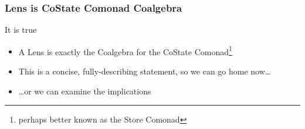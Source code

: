 \begin{frame}
\frametitle{Lens is CoState Comonad Coalgebra}

\begin{block}{It is true}
  \begin{itemize}
  \item A Lens is exactly the Coalgebra for the CoState Comonad\footnote{perhaps better known as the Store Comonad}
  \item This is a concise, fully-describing statement, so we can go home now\ldots
  \item \ldots or we can examine the implications
  \end{itemize}
\end{block}
\end{frame}

